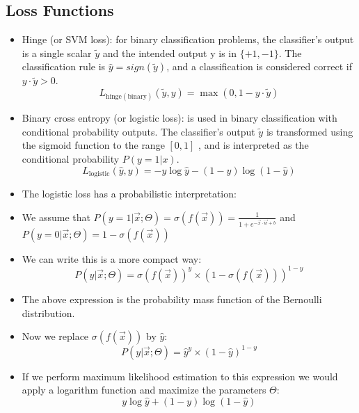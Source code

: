 



\subsection{Loss Functions}
\begin{itemize}
 \item Hinge (or SVM loss):  for binary classification problems, the classifier's output is a single scalar $\tilde{y}$ and the intended output y is in $\{+1,-1\}$.  The classification rule is $\hat{y} = sign(\tilde{y})$, and a classification is considered correct if $y \cdot \tilde{y} > 0$.  
 \begin{displaymath}
  L_{\text{hinge}(\text{binary})}(\tilde{y},y) = \max(0,1-y \cdot \tilde{y})  
 \end{displaymath}

 \item Binary cross entropy (or logistic loss): is used in binary classification with conditional probability outputs. The classifier's output $\tilde{y}$ is transformed using the sigmoid function to the range $[0,1]$ , and is interpreted as the conditional probability $P(y=1|x)$.
  \begin{displaymath}
  L_{\text{logistic}}(\hat{y},y) = -y \log \hat{y} - (1-y) \log(1-\hat{y})  
 \end{displaymath}
 \item The logistic loss has a probabilistic interpretation:
 \item We assume that $P(y =1 | \vec{x} ; \Theta) = \sigma(f(\vec{x})) = \frac{1}{1+e^{-\vec{x}\cdot \vec{w}+b}}$  and $P(y = 0 | \vec{x} ; \Theta) = 1 - \sigma(f(\vec{x}))$
 \item We can write this is a more compact way: 
 \begin{displaymath}
  P(y | \vec{x} ; \Theta) = \sigma(f(\vec{x}))^y\times(1-\sigma(f(\vec{x})))^{1-y}
 \end{displaymath}

 \item The above expression is the probability mass function of the Bernoulli distribution.
 
\item Now we replace $\sigma(f(\vec{x}))$ by $\hat{y}$:
 \begin{displaymath}
  P(y | \vec{x} ; \Theta) = \hat{y}^y\times(1-\hat{y})^{1-y}
 \end{displaymath} 
\item If we perform maximum likelihood estimation to this expression we would apply a logarithm function and maximize the parameters $\Theta$:
 \begin{displaymath}
  y \log \hat{y} + (1-y) \log(1-\hat{y}) 
 \end{displaymath} 
 

\end{itemize}
